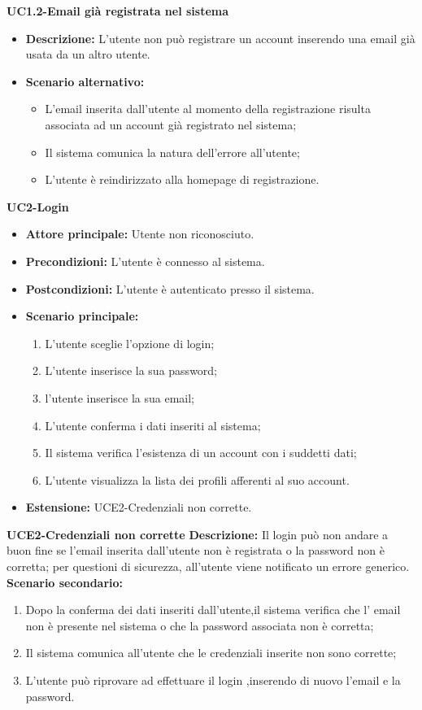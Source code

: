 \textbf{UC1.2-Email già registrata nel sistema}
\begin{itemize}
    \item \textbf{Descrizione: }L'utente non può registrare un account inserendo una email già usata da un altro utente.
    \item \textbf{Scenario alternativo:}
    \begin{itemize}
        \item L'email inserita dall'utente al momento della registrazione risulta associata ad un
        account già registrato nel sistema;
        \item Il sistema comunica la natura dell'errore all'utente;
        \item L'utente è reindirizzato alla homepage di registrazione.
    \end{itemize}
\end{itemize}
\break

\textbf{UC2-Login}
\begin{itemize}
\item \textbf{Attore principale:} Utente non riconosciuto.
\item \textbf{Precondizioni:} L'utente è connesso al sistema.
\item \textbf{Postcondizioni:} L'utente è autenticato presso il sistema.
\item \textbf{Scenario principale:}
\begin{enumerate}
    \item L'utente sceglie l'opzione di login;
    \item L'utente inserisce la sua password;
    \item l'utente inserisce la sua email;
    \item L'utente conferma i dati inseriti al sistema;
    \item Il sistema verifica l'esistenza di un account con i suddetti dati;
    \item L'utente visualizza la lista dei profili afferenti al suo account.
\end{enumerate}
    \item \textbf{Estensione: }UCE2-Credenziali non corrette.
\end{itemize}

\textbf{UCE2-Credenziali non corrette}
\textbf{Descrizione: }Il login può non andare a buon fine se l'email inserita dall'utente non è registrata 
o la password non è corretta; per questioni di sicurezza, all'utente viene notificato un errore generico.
\textbf{Scenario secondario:}
\begin{enumerate}
    \item Dopo la conferma dei dati inseriti dall'utente,il sistema verifica 
    che l' email non è presente nel sistema o che la password associata non è corretta;
    \item Il sistema comunica all'utente che le credenziali inserite non sono corrette;
    \item L'utente può riprovare ad effettuare il login ,inserendo di nuovo l'email e la password.
\end{enumerate}

